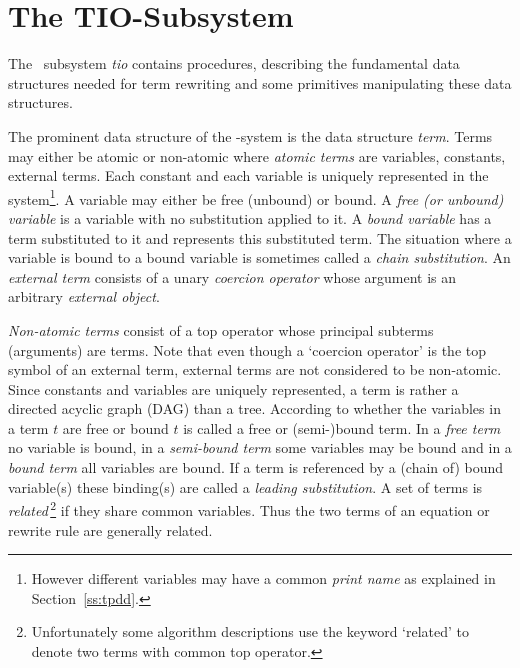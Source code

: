 \section{The TIO-Subsystem} \label{se:tio}

The \redux\ subsystem {\it tio} contains procedures, describing the
fundamental data structures needed for term rewriting and 
some primitives manipulating these data structures.

The prominent data structure of the \redux-system is the data structure 
{\em term}.
Terms may either be atomic or non-atomic where {\em atomic terms}
are variables, constants, external terms.
Each constant and each variable is uniquely represented in the system\footnote{
However different variables may have a common {\em print name} as explained
in Section~\ref{ss:tpdd}.}.
A variable may either be free (unbound) or bound.
A {\em free (or unbound) variable} is a variable with no substitution applied 
to it.
A {\em bound variable} has a term substituted to it and represents this
substituted term.
The situation where a variable is bound to a bound variable is sometimes
called a {\em chain substitution}.
An {\em external term}
consists of a unary {\em coercion operator}
whose argument is an arbitrary {\em external object}.

{\em Non-atomic terms} consist of a top operator whose principal subterms 
(arguments) are terms.
Note that even though a `coercion operator' is the top symbol of an external
term, external terms are not considered to be non-atomic.
Since constants and variables are uniquely represented, a term is rather a
directed acyclic graph (DAG) than a tree.
According to whether the variables in a term $t$ are free or bound $t$ is
called a free or (semi-)bound term.
In a {\em free term} no variable is bound, in a {\em semi-bound term} some
variables may be bound and in a {\em bound term} all variables are bound.
If a term is referenced by a (chain of) bound variable(s) these binding(s)
are called a {\em leading substitution}.
A set of terms is {\em related}\,\footnote{Unfortunately some algorithm 
descriptions use the keyword `related' to denote two terms with common
top operator.} if they share common variables.
Thus the two terms of an equation or rewrite rule are generally related.

